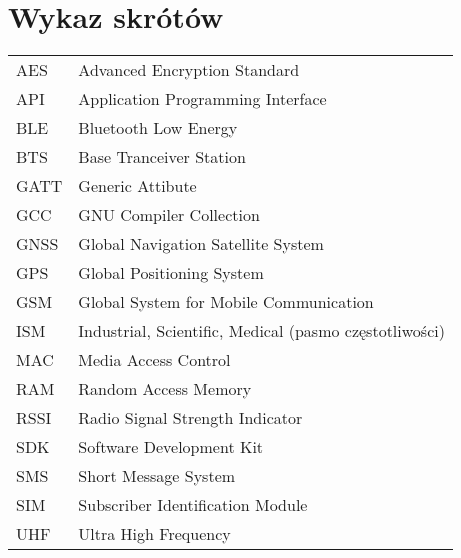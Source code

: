 \chapter*{Wykaz skrótów}

\begin{tabular}{l l}
AES & Advanced Encryption Standard \\
API & Application Programming Interface \\
BLE & Bluetooth Low Energy \\
BTS & Base Tranceiver Station \\
GATT & Generic Attibute \\
GCC & GNU Compiler Collection \\
GNSS & Global Navigation Satellite System \\
GPS & Global Positioning System \\
GSM & Global System for Mobile Communication \\
ISM & Industrial, Scientific, Medical (pasmo częstotliwości) \\
MAC & Media Access Control \\
RAM & Random Access Memory \\
RSSI & Radio Signal Strength Indicator \\
SDK & Software Development Kit \\
SMS & Short Message System \\
SIM & Subscriber Identification Module \\
UHF & Ultra High Frequency \\




\end{tabular}
